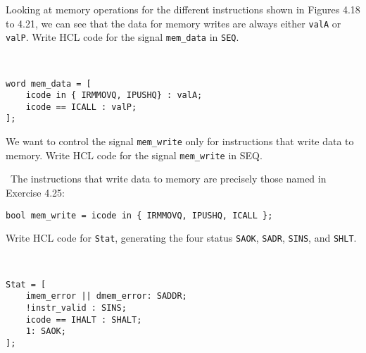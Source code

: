 \documentclass[12pt]{article}
\newenvironment{ex}[2][Exercise]{\begin{trivlist}
		\item[\hskip \labelsep {\bfseries #1}\hskip \labelsep {\bfseries #2.}]}{\end{trivlist}}
\newenvironment{sol}[1][Solution]{\begin{trivlist}
		\item[\hskip \labelsep {\bfseries #1:}]}{\end{trivlist}}
\begin{document}
\begin{ex}{4.25}
	Looking at memory operations for the different instructions shown in Figures
	4.18 to 4.21, we can see that the data for memory writes are always either
	\texttt{valA} or \texttt{valP}. Write HCL code for the signal \texttt{mem\_data}
	in \texttt{SEQ}.
\end{ex}

\begin{sol}
	\
	\begin{lstlisting}[language={}]
word mem_data = [
	icode in { IRMMOVQ, IPUSHQ} : valA;
	icode == ICALL : valP;
];
	\end{lstlisting}
\end{sol}

\begin{ex}{4.26}
	We want to control the signal \texttt{mem\_write} only for instructions that
	write data to memory. Write HCL code for the signal \texttt{mem\_write} in
	SEQ.
\end{ex}

\begin{sol}
	\
	The instructions that write data to memory are precisely those named
	in Exercise 4.25:
	\begin{lstlisting}[language={}]
bool mem_write = icode in { IRMMOVQ, IPUSHQ, ICALL };
	\end{lstlisting}
\end{sol}

\begin{ex}{4.27}
	Write HCL code for \texttt{Stat}, generating the four status \texttt{SAOK},
	\texttt{SADR}, \texttt{SINS}, and \texttt{SHLT}.
\end{ex}

\begin{sol}
	\
	\begin{lstlisting}[language={}]
Stat = [
	imem_error || dmem_error: SADDR;
	!instr_valid : SINS;
	icode == IHALT : SHALT;
	1: SAOK;
];
	\end{lstlisting}
\end{sol}
\end{document}
